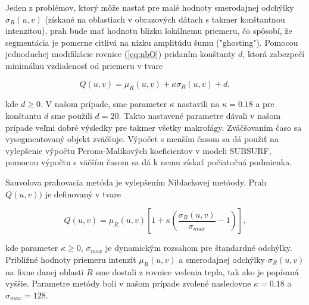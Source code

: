 \documentclass[a4paper,11pt,oneside]{article}%
\begin{document}
Jeden z problémov, ktorý môže nastať pre malé hodnoty smerodajnej odchýlky $\sigma_R(u,v)$ (získané na oblastiach v obrazových dátach s takmer konštantnou intenzitou), prah bude mať hodnotu blízku lokálnemu priemeru, čo spôsobí, že segmentácia je pomerne citlivá na nízku amplitúdu šumu ("ghosting"). Pomocou jednoduchej modifikácie rovnice (\ref{eq:nbO}) pridaním konštanty $d$, ktorá zabezpečí minimálnu vzdialenosť od priemeru v tvare

\begin{equation} \label{eq:nb}
Q(u,v) = \mu_R(u,v) + \kappa\sigma_R(u,v) + d,
\end{equation}

kde $d \geq 0$. V našom prípade, sme parameter $\kappa$ nastavili na $\kappa = 0.18$ a pre konštantu $d$ sme použili $d = 20$. Takto nastavené parametre dávali v našom prípade veľmi dobré výsledky pre takmer všetky makrofágy. Zväčšovaním časo sa vysegmentovaný objekt zväčšuje. Výpočet s menším časom sa dá použiť na vylepšenie výpočtu Perona-Malikových koeficientov v modeli SUBSURF, pomocou výpočtu  s väčším časom sa dá k nemu získať počiatočná podmienka.


Sauvolova prahovacia metóda je vylepšením Niblackovej metóody. Prah $Q(u,v))$ je definovaný v tvare

\begin{equation}  \label{eq:sav}
Q(u,v) = \mu_R(u,v) [1 + \kappa(\frac{\sigma_R(u,v)}{\sigma_{max}} - 1)],
\end{equation}

kde parameter $\kappa \geq 0$, $\sigma_{max}$ je dynamickým rozsahom pre štandardné odchýlky. Približné hodnoty priemeru intenzít $\mu_R(u,v)$ a smerodajnej odchýlky  $\sigma_R(u,v)$ na fixne danej oblasti $R$ sme dostali z rovnice vedenia tepla, tak ako je popísaná vyššie. 
Parametre metódy boli v našom prípade zvolené nasledovne $\kappa = 0.18$ a  $\sigma_{max} = 128$. 

\end{document}

